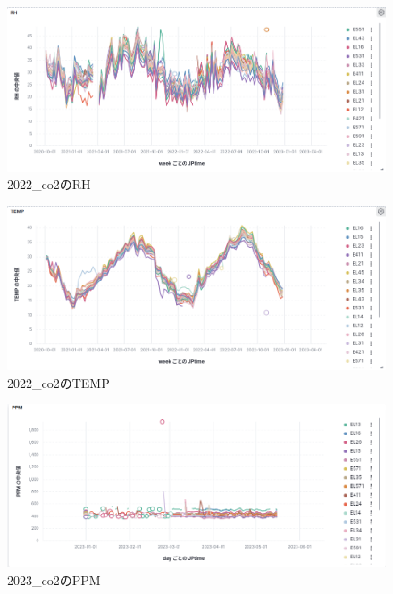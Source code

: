 \documentclass[a4j,12pt,]{jarticle}
\begin{document}
\begin{figure}[H]
  \begin{center}
    \includegraphics[width=160mm]{2022_rh.png}
    \caption{2022\_co2のRH}
    \label{p2}
  \end{center}
\end{figure}

\begin{figure}[H]
  \begin{center}
    \includegraphics[width=160mm]{2022_temp.png}
    \caption{2022\_co2のTEMP}
    \label{p3}
  \end{center}
\end{figure}

\begin{figure}[H]
  \begin{center}
    \includegraphics[width=160mm]{2023_ppm.png}
    \caption{2023\_co2のPPM}
    \label{p4}
  \end{center}
\end{figure}
\end{document}
